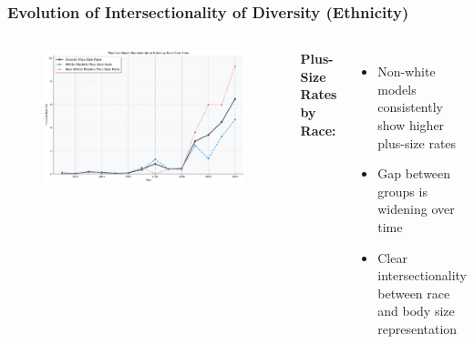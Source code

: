 \documentclass[aspectratio=169,xcolor=dvipsnames,10pt]{beamer}
\begin{document}
\begin{frame}[t]
    \frametitle{Evolution of Intersectionality of Diversity (Ethnicity)}
    

    
    \vspace{0.5em}
    \begin{columns}

                   \begin{figure}
            \begin{center}
            \includegraphics[width=\textwidth]{figures/plus_size_rates_by_race.png}
            \end{center}
        \end{figure}
        
            \textbf{Plus-Size Rates by Race:}
            \vspace{0.4em}
            \begin{itemize}
                \setlength{\itemsep}{0.4em}
                \pause \item Non-white models consistently show higher plus-size rates
                \pause \item Gap between groups is widening over time
                \pause \item Clear intersectionality between race and body size representation
            \end{itemize}
        
      
    \end{columns}
\end{frame}
\end{document}
